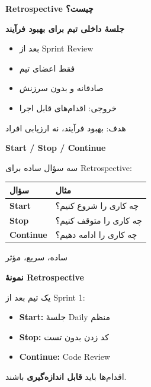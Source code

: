 \documentclass[14pt, a4paper, landscape]{extarticle}
\newcommand{\slide}[1]{%
    \newpage
    \begin{center}
    \begin{minipage}[t]{0.95\textwidth}
    \vspace{0.5cm}
    #1
    \vspace{0.5cm}
    \end{minipage}
    \end{center}
}
\newcommand{\slidetitle}[1]{%
    \begin{center}
        {\LARGE\bfseries\textcolor{primary}{#1}}
    \end{center}
    \vspace{0.5cm}
}
\newcommand{\myaccent}[1]{\textcolor{accent}{#1}}
\begin{document}
\slide{
    \slidetitle{Retrospective چیست؟}
    \vspace{0.5cm}
    \begin{center}
        {\large\bfseries جلسهٔ داخلی تیم برای بهبود فرآیند}
    \end{center}
    \vspace{0.8cm}
    \begin{itemize}[itemsep=0.6em]
        \item {\large بعد از Sprint Review}
        \item {\large فقط اعضای تیم}
        \item {\large صادقانه و بدون سرزنش}
        \item {\large خروجی: اقدام‌های قابل اجرا}
    \end{itemize}
    \vspace{0.8cm}
    \begin{center}
        {\myaccent{هدف: بهبود فرآیند، نه ارزیابی افراد}}
    \end{center}
}

\slide{
    \slidetitle{Start / Stop / Continue}
    \vspace{0.5cm}
    {\large سه سؤال ساده برای Retrospective:}
    \vspace{0.8cm}
    \begin{center}
        \begin{tabular}{lp{8cm}}
            \toprule
            \textbf{سؤال} & \textbf{مثال} \\
            \midrule
            \textbf{Start} & چه کاری را شروع کنیم؟ \\
            \hline
            \textbf{Stop} & چه کاری را متوقف کنیم؟ \\
            \hline
            \textbf{Continue} & چه کاری را ادامه دهیم؟ \\
            \bottomrule
        \end{tabular}
    \end{center}
    \vspace{0.8cm}
    \begin{center}
        {\large\myaccent{ساده، سریع، مؤثر}}
    \end{center}
}

\slide{
    \slidetitle{نمونهٔ Retrospective}
    \vspace{0.5cm}
    {\large یک تیم بعد از Sprint 1:}
    \vspace{0.8cm}
    \begin{itemize}[itemsep=0.6em]
        \item {\large\textbf{Start:} جلسهٔ Daily منظم}
        \item {\large\textbf{Stop:} کد زدن بدون تست}
        \item {\large\textbf{Continue:} Code Review}
    \end{itemize}
    \vspace{0.8cm}
    \begin{center}
        {\myaccent{اقدام‌ها باید \textbf{قابل اندازه‌گیری} باشند.}}
    \end{center}
}
\end{document}
